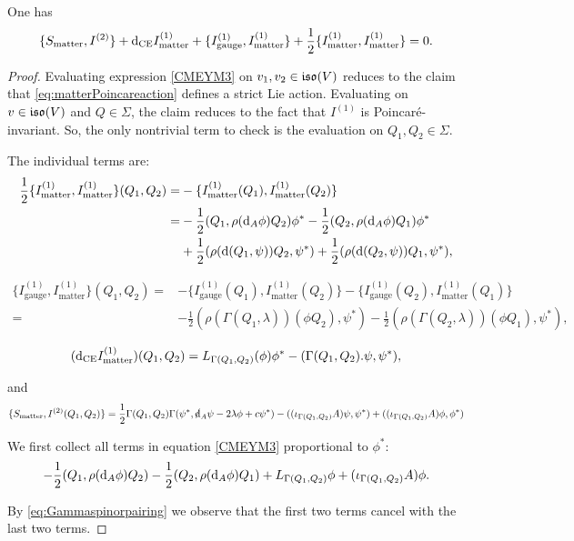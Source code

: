 \documentclass[10pt, oneside]{article}
\newcommand{\gauge}{\mathrm{gauge}}
\newcommand{\matter}{\mathrm{matter}}
\begin{document}
\begin{lemma} 
One has
\begin{equation}\label{CMEYM3}
\{S_{\matter}, I^{(2)}\} + \d_{\mr{CE}} I_{\matter}^{(1)} + \{I_{\gauge}^{(1)}, I_{\matter}^{(1)}\} + \frac{1}{2} \{I_{\matter}^{(1)}, I_{\matter}^{(1)}\} = 0 .
\end{equation}
\end{lemma}
\begin{proof}
Evaluating expression \eqref{CMEYM3} on $v_1,v_2 \in \mathfrak{iso}(V)$ reduces to the claim that \eqref{eq:matterPoincareaction} defines a strict Lie action. Evaluating on $v \in \mathfrak{iso}(V)$ and $Q \in \Sigma$, the claim reduces to the fact that $I^{(1)}$ is Poincar\'{e}-invariant. So, the only nontrivial term to check is the evaluation on $Q_1,Q_2 \in \Sigma$. 

The individual terms are:
\begin{align*}
\frac{1}{2}\{I_{\matter}^{(1)}, I_{\matter}^{(1)}\}(Q_1, Q_2) =& -\{I_{\matter}^{(1)}(Q_1), I_{\matter}^{(1)}(Q_2)\} \\
=&-\frac{1}{2}(Q_1, \rho(\d_A \phi) Q_2)\phi^* - \frac{1}{2}(Q_2, \rho(\d_A \phi)Q_1)\phi^* \\ &  +\frac{1}{2}(\rho(\d(Q_1,\psi))Q_2, \psi^*) +\frac{1}{2} (\rho(\d(Q_2, \psi)) Q_1, \psi^*),
\end{align*}

\begin{align*}
\{I_{\gauge}^{(1)}, I_{\matter}^{(1)}\}(Q_1, Q_2) = &-\{I_{\gauge}^{(1)}(Q_1), I_{\matter}^{(1)}(Q_2)\} - \{I_{\gauge}^{(1)}(Q_2), I_{\matter}^{(1)}(Q_1)\} \\
=& -\frac{1}{2}(\rho(\Gamma(Q_1, \lambda))(\phi Q_2), \psi^*) - \frac{1}{2}(\rho(\Gamma(Q_2, \lambda))(\phi Q_1), \psi^*),
\end{align*}

\[
(\d_{\mr{CE}}I_{\matter}^{(1)})(Q_1,Q_2) = L_{\Gamma(Q_1,Q_2)} (\phi)\phi^* - (\Gamma(Q_1,Q_2).\psi, \psi^*),
\]

and
\[
\{S_{\matter}, I^{(2)}(Q_1,Q_2)\} =  \frac{1}{2} \Gamma(Q_1,Q_2) \Gamma(\psi^*, \sd \d_A \psi - 2 \lambda\phi + c\psi^*) - ((\iota_{\Gamma(Q_1, Q_2)} A)\psi, \psi^*) + ((\iota_{\Gamma(Q_1, Q_2)} A)\phi, \phi^*)
\]

We first collect all terms in equation \eqref{CMEYM3} proportional to $\phi^*$:
\[
-\frac{1}{2} (Q_1, \rho({\rm d}_A\phi) Q_2) - \frac{1}{2} (Q_2, \rho({\rm d}_A \phi) Q_1) + L_{\Gamma(Q_1,Q_2)} \phi + (\iota_{\Gamma(Q_1, Q_2)} A)\phi.
\]

By \eqref{eq:Gammaspinorpairing} we observe that the first two terms cancel with the last two terms.


\end{proof}
\end{document}
